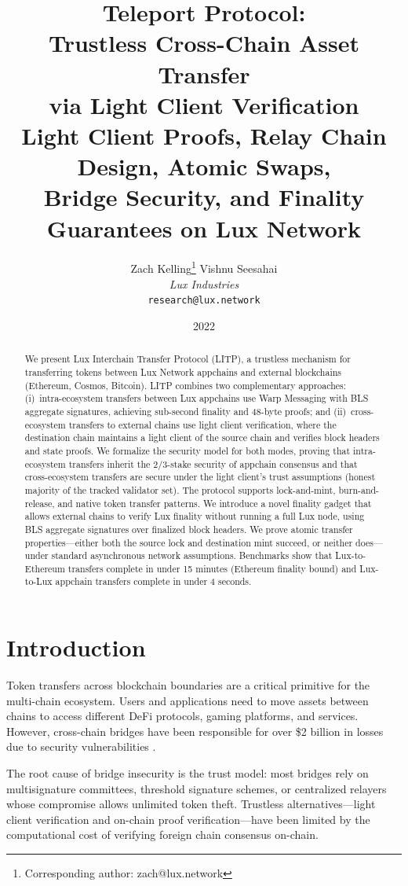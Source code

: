 \documentclass[11pt,a4paper]{article}
\title{\textbf{Teleport Protocol:\\Trustless Cross-Chain Asset Transfer\\via Light Client Verification}\\[6pt]
\large Light Client Proofs, Relay Chain Design, Atomic Swaps,\\Bridge Security, and Finality Guarantees on Lux Network}
\author{
Zach Kelling\thanks{Corresponding author: zach@lux.network}
\quad
Vishnu Seesahai\\
\textit{Lux Industries}\\
\texttt{research@lux.network}
}
\date{2022}
\begin{document}
\luxcoverpage
\maketitle

\begin{abstract}
We present Lux Interchain Transfer Protocol (LITP), a trustless mechanism for transferring tokens between Lux Network appchains and external blockchains (Ethereum, Cosmos, Bitcoin). LITP combines two complementary approaches: (i)~intra-ecosystem transfers between Lux appchains use Warp Messaging with BLS aggregate signatures, achieving sub-second finality and 48-byte proofs; and (ii)~cross-ecosystem transfers to external chains use light client verification, where the destination chain maintains a light client of the source chain and verifies block headers and state proofs. We formalize the security model for both modes, proving that intra-ecosystem transfers inherit the $2/3$-stake security of appchain consensus and that cross-ecosystem transfers are secure under the light client's trust assumptions (honest majority of the tracked validator set). The protocol supports lock-and-mint, burn-and-release, and native token transfer patterns. We introduce a novel finality gadget that allows external chains to verify Lux finality without running a full Lux node, using BLS aggregate signatures over finalized block headers. We prove atomic transfer properties---either both the source lock and destination mint succeed, or neither does---under standard asynchronous network assumptions. Benchmarks show that Lux-to-Ethereum transfers complete in under 15 minutes (Ethereum finality bound) and Lux-to-Lux appchain transfers complete in under 4 seconds.
\end{abstract}

\section{Introduction}

Token transfers across blockchain boundaries are a critical primitive for the multi-chain ecosystem. Users and applications need to move assets between chains to access different DeFi protocols, gaming platforms, and services. However, cross-chain bridges have been responsible for over \$2 billion in losses due to security vulnerabilities \cite{zamyatin2021bridge, ronin2022, wormhole2022}.

The root cause of bridge insecurity is the trust model: most bridges rely on multisignature committees, threshold signature schemes, or centralized relayers whose compromise allows unlimited token theft. Trustless alternatives---light client verification and on-chain proof verification---have been limited by the computational cost of verifying foreign chain consensus on-chain.
\end{document}
